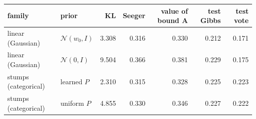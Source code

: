 \begin{tabular}{llrrrrr}
\toprule
family & prior & KL & Seeger & value of bound A & test Gibbs & test vote \\
\midrule
linear (Gaussian) & $\mathcal{N}(w_0,I)$ & 3.308 & 0.316 & 0.330 & 0.212 & 0.171 \\
linear (Gaussian) & $\mathcal{N}(0,I)$ & 9.504 & 0.366 & 0.381 & 0.229 & 0.175 \\
stumps (categorical) & learned $P$ & 2.310 & 0.315 & 0.328 & 0.225 & 0.223 \\
stumps (categorical) & uniform $P$ & 4.855 & 0.330 & 0.346 & 0.227 & 0.222 \\
\bottomrule
\end{tabular}
